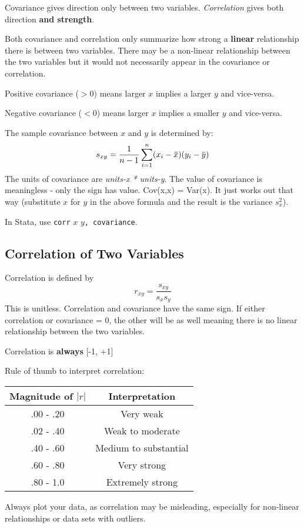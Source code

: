 \documentclass[11pt, oneside]{article}   	%
\newcommand{\overbar}[1]{\mkern 1.5mu\overline{\mkern-1.5mu#1\mkern-1.5mu}\mkern 1.5mu}
\begin{document}
Covariance gives direction only between two variables. \textit{Correlation} gives both direction \textbf{and strength}.

Both covariance and correlation only summarize how strong a \textbf{linear} relationship there is between two variables. There may be a non-linear relationship between the two variables but it would not necessarily appear in the covariance or correlation.

Positive covariance ($>0$) means larger $x$ implies a larger $y$ and vice-versa.

Negative covariance ($<0$) means larger $x$ implies a smaller $y$ and vice-versa.

The sample covariance between $x$ and $y$ is determined by:
\[
s_{xy} = \frac{1} {n-1} \sum\limits_{i=1}^n (x_i - \overbar{x}) (y_i - \overbar{y})
\]
The units of covariance are \textit{units-x * units-y}. The value of covariance is meaningless - only the sign has value. Cov(x,x) = Var(x). It just works out that way (substitute $x$ for $y$ in the above formula and the result is the variance $s^2_x$).

In Stata, use \texttt{corr} $x$ $y$\texttt{, covariance}. 

\subsection{Correlation of Two Variables}

Correlation is defined by
\[
r_{xy} = \frac{s_{xy}} {s_xs_y}
\]
This is unitless. Correlation and covariance have the same sign. If either correlation or covariance = 0, the other will be as well meaning there is no linear relationship between the two variables.

Correlation is \textbf{always} [-1, +1]

Rule of thumb to interpret correlation:

\begin{tabular}{c | c}
Magnitude of $|r|$ & Interpretation \\
\hline
.00 - .20   & Very weak \\
.02 - .40   & Weak to moderate \\
.40 - .60   & Medium to substantial \\
.60 - .80   & Very strong \\
.80 - 1.0   & Extremely strong\\
\end{tabular}

Always plot your data, as correlation may be misleading, especially for non-linear relationships or data sets with outliers.
\end{document}
